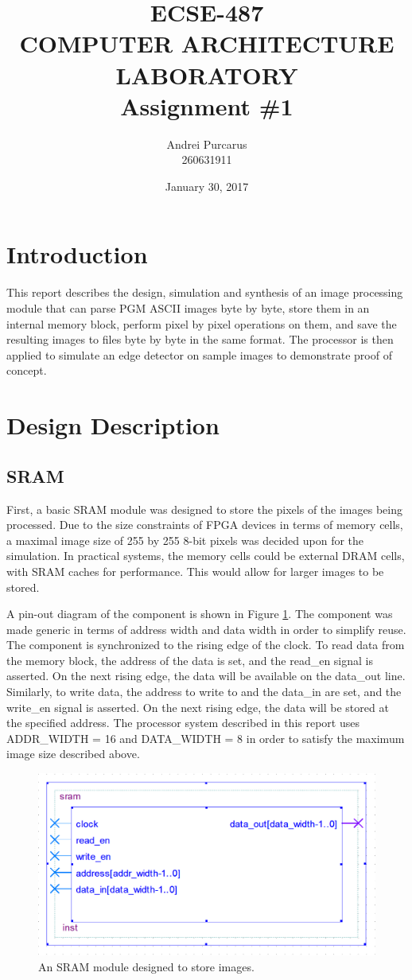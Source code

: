 \documentclass[a4paper, 10pt, titlepage]{article}
\title{\textbf{ECSE-487 \\ COMPUTER ARCHITECTURE LABORATORY \\ Assignment \#1}}
\author{Andrei Purcarus \\ 260631911}
\date{January 30, 2017}
\begin{document}
\maketitle

\section{Introduction}

This report describes the design, simulation and synthesis of an image processing module that can parse PGM ASCII images byte by byte, store them in an internal memory block, perform pixel by pixel operations on them, and save the resulting images to files byte by byte in the same format. The processor is then applied to simulate an edge detector on sample images to demonstrate proof of concept.

\section{Design Description}

\subsection{SRAM}

First, a basic SRAM module was designed to store the pixels of the images being processed. Due to the size constraints of FPGA devices in terms of memory cells, a maximal image size of 255 by 255 8-bit pixels was decided upon for the simulation. In practical systems, the memory cells could be external DRAM cells, with SRAM caches for performance. This would allow for larger images to be stored.

A pin-out diagram of the component is shown in Figure \ref{fig:sram}. The component was made generic in terms of address width and data width in order to simplify reuse. The component is synchronized to the rising edge of the clock. To read data from the memory block, the address of the data is set, and the read\_en signal is asserted. On the next rising edge, the data will be available on the data\_out line. Similarly, to write data, the address to write to and the data\_in are set, and the write\_en signal is asserted. On the next rising edge, the data will be stored at the specified address. The processor system described in this report uses ADDR\_WIDTH = 16 and DATA\_WIDTH = 8 in order to satisfy the maximum image size described above.

\begin{figure}
    \centering
    \includegraphics[width=0.5\linewidth]{sram_entity.PNG}
    \caption{An SRAM module designed to store images.}
    \label{fig:sram}
\end{figure}
\end{document}
